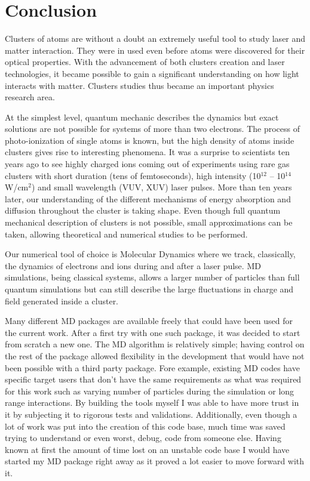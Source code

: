 \section{Conclusion}

Clusters of atoms are without a doubt an extremely useful tool to study
laser and matter interaction. They were in used even before atoms were discovered
for their optical properties. With the advancement of both clusters creation
and laser technologies, it became possible to gain a significant understanding
on how light interacts with matter. Clusters studies thus became an important
physics research area.

At the simplest level, quantum mechanic describes the dynamics but exact solutions
are not possible for systems of more than two electrons.
The process of photo-ionization of single atoms is known, but the high density
of atoms inside clusters gives rise to interesting phenomena. It was a surprise
to scientists ten years ago to see highly charged ions coming out of experiments
using rare gas clusters with short duration (tens of femtoseconds), high intensity
(10$^{12}$ -- 10$^{14}$ W/cm$^2$) and small wavelength (VUV, XUV) laser pulses.
More than ten years later, our understanding of the different mechanisms of energy
absorption and diffusion throughout the cluster is taking shape. Even though full
quantum mechanical description of clusters is not possible, small approximations
can be taken, allowing theoretical and numerical studies to be performed.

Our numerical tool of choice is Molecular Dynamics where we track, classically,
the dynamics of electrons and ions during and after a laser pulse. MD simulations,
being classical systems, allows a larger number of particles than full quantum
simulations but can still describe the large fluctuations in charge and field
generated inside a cluster.

Many different MD packages are available freely that could have been used for
the current work. After a first try with one such package, it was decided to
start from scratch a new one. The MD algorithm is relatively simple; having
control on the rest of the package allowed flexibility in the development that
would have not been possible with a third party package. Fore example, existing
MD codes have specific target users that don't have the same requirements as what
was required for this work such as varying number of particles during the
simulation or long range interactions. By building the tools myself I was able
to have more trust in it by subjecting it to rigorous tests and validations.
Additionally, even though a lot of work was put into the creation of this code
base, much time was saved trying to understand or even worst, debug, code from
someone else. Having known at first the amount of time lost on an unstable code
base I would have started my MD package right away as it proved a lot easier
to move forward with it.


